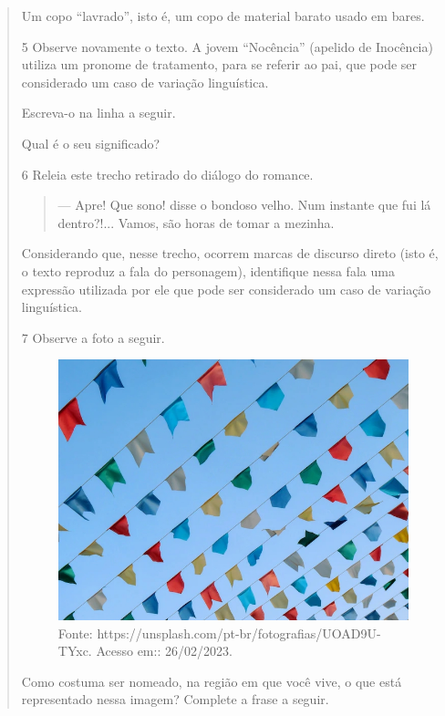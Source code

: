 \begin{quote}
\begin{boxlist}
 Um copo “lavrado”, isto é, um copo de material barato usado em bares.
\end{boxlist}

\num{5} Observe novamente o texto. A jovem “Nocência” (apelido de
Inocência) utiliza um pronome de tratamento, para se referir ao pai, que
pode ser considerado um caso de variação linguística.

\begin{escolha}
\item Escreva-o na linha a seguir.


\item Qual é o seu significado?

\end{escolha}

\num{6} Releia este trecho retirado do diálogo do romance.

\begin{quote}
--- Apre! Que sono! disse o bondoso velho. Num instante que fui lá
dentro?!... Vamos, são horas de tomar a mezinha.
\end{quote}

Considerando que, nesse trecho, ocorrem marcas de discurso direto (isto é,
o texto reproduz a fala do personagem), identifique nessa fala uma
expressão utilizada por ele que pode ser considerado um caso de
variação linguística.


\pagebreak

\num{7} Observe a foto a seguir.

\begin{figure}[htpb!]
\includegraphics[width=.5\textwidth]{./imgs/img19.jpg}
\caption{Fonte: https://unsplash.com/pt-br/fotografias/UOAD9U-TYxc. Acesso em:: 26/02/2023.}
\end{figure}


Como costuma ser nomeado, na região em que você vive, o que está representado nessa imagem?
Complete a frase a seguir.\bigskip


\end{quote}
